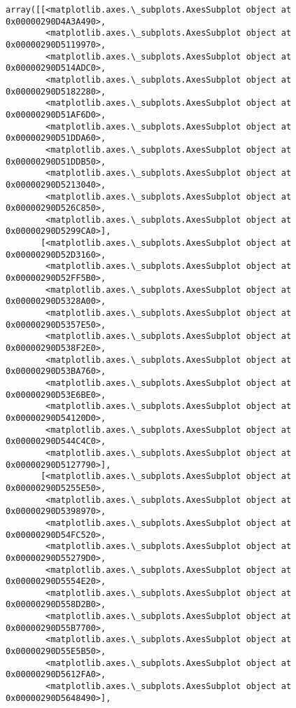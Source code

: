 \documentclass[11pt]{article}
\makeatletter
\newcommand{\boxspacing}{\kern\kvtcb@left@rule\kern\kvtcb@boxsep}
\newcommand{\prompt}[4]{
        \ttfamily\llap{{\color{#2}[#3]:\hspace{3pt}#4}}\vspace{-\baselineskip}
    }
\makeatother
\begin{document}
            \begin{tcolorbox}[breakable, size=fbox, boxrule=.5pt, pad at break*=1mm, opacityfill=0]
\prompt{Out}{outcolor}{5}{\boxspacing}
\begin{Verbatim}[commandchars=\\\{\}]
array([[<matplotlib.axes.\_subplots.AxesSubplot object at 0x00000290D4A3A490>,
        <matplotlib.axes.\_subplots.AxesSubplot object at 0x00000290D5119970>,
        <matplotlib.axes.\_subplots.AxesSubplot object at 0x00000290D514ADC0>,
        <matplotlib.axes.\_subplots.AxesSubplot object at 0x00000290D5182280>,
        <matplotlib.axes.\_subplots.AxesSubplot object at 0x00000290D51AF6D0>,
        <matplotlib.axes.\_subplots.AxesSubplot object at 0x00000290D51DDA60>,
        <matplotlib.axes.\_subplots.AxesSubplot object at 0x00000290D51DDB50>,
        <matplotlib.axes.\_subplots.AxesSubplot object at 0x00000290D5213040>,
        <matplotlib.axes.\_subplots.AxesSubplot object at 0x00000290D526C850>,
        <matplotlib.axes.\_subplots.AxesSubplot object at 0x00000290D5299CA0>],
       [<matplotlib.axes.\_subplots.AxesSubplot object at 0x00000290D52D3160>,
        <matplotlib.axes.\_subplots.AxesSubplot object at 0x00000290D52FF5B0>,
        <matplotlib.axes.\_subplots.AxesSubplot object at 0x00000290D5328A00>,
        <matplotlib.axes.\_subplots.AxesSubplot object at 0x00000290D5357E50>,
        <matplotlib.axes.\_subplots.AxesSubplot object at 0x00000290D538F2E0>,
        <matplotlib.axes.\_subplots.AxesSubplot object at 0x00000290D53BA760>,
        <matplotlib.axes.\_subplots.AxesSubplot object at 0x00000290D53E6BE0>,
        <matplotlib.axes.\_subplots.AxesSubplot object at 0x00000290D54120D0>,
        <matplotlib.axes.\_subplots.AxesSubplot object at 0x00000290D544C4C0>,
        <matplotlib.axes.\_subplots.AxesSubplot object at 0x00000290D5127790>],
       [<matplotlib.axes.\_subplots.AxesSubplot object at 0x00000290D5255E50>,
        <matplotlib.axes.\_subplots.AxesSubplot object at 0x00000290D5398970>,
        <matplotlib.axes.\_subplots.AxesSubplot object at 0x00000290D54FC520>,
        <matplotlib.axes.\_subplots.AxesSubplot object at 0x00000290D55279D0>,
        <matplotlib.axes.\_subplots.AxesSubplot object at 0x00000290D5554E20>,
        <matplotlib.axes.\_subplots.AxesSubplot object at 0x00000290D558D2B0>,
        <matplotlib.axes.\_subplots.AxesSubplot object at 0x00000290D55B7700>,
        <matplotlib.axes.\_subplots.AxesSubplot object at 0x00000290D55E5B50>,
        <matplotlib.axes.\_subplots.AxesSubplot object at 0x00000290D5612FA0>,
        <matplotlib.axes.\_subplots.AxesSubplot object at 0x00000290D5648490>],

\end{Verbatim}
\end{tcolorbox}
\end{document}
